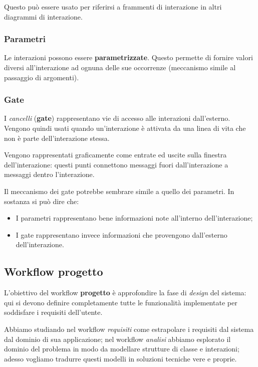\documentclass[a4paper,11pt]{article}
\begin{document}
Questo può essere usato per riferirsi a frammenti di interazione in altri diagrammi di interazione.

\subsubsection{Parametri}
Le interazioni possono essere \textbf{parametrizzate}.
Questo permette di fornire valori diversi all'interazione ad ognuna delle sue occorrenze (meccanismo simile al passaggio di argomenti).

\subsubsection{Gate}
I \textit{cancelli} (\textbf{gate}) rappresentano vie di accesso alle interazioni dall'esterno. Vengono quindi usati quando un’interazione è attivata da una linea di vita che non è parte dell’interazione stessa.

Vengono rappresentati graficamente come entrate ed uscite sulla finestra dell'interazione: questi punti connettono messaggi fuori dall'interazione a messaggi dentro l'interazione.

\par\smallskip

Il meccanismo dei gate potrebbe sembrare simile a quello dei parametri. In sostanza si può dire che:
\begin{itemize}
	\item I parametri rappresentano bene informazioni note all'interno dell'interazione;
	\item I gate rappresentano invece informazioni che provengono dall'esterno dell'interazione.
\end{itemize}

\subsection{Workflow progetto}
L'obiettivo del workflow \textbf{progetto} è approfondire la fase di \textit{design} del sistema: qui si devono definire completamente tutte le funzionalità implementate per soddisfare i requisiti dell'utente.

Abbiamo studiando nel workflow \textit{requisiti} come estrapolare i requisiti dal sistema dal dominio di sua applicazione; nel workflow \textit{analisi} abbiamo esplorato il dominio del problema in modo da modellare strutture di classe e interazioni; adesso vogliamo tradurre questi modelli in soluzioni tecniche vere e proprie.
\end{document}
